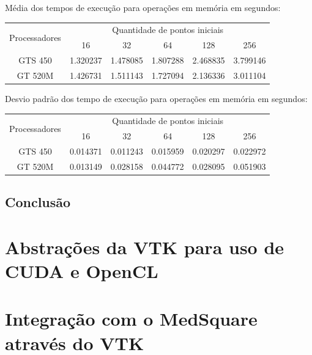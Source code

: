     \hspace{1mm}\newline
    
    \noindent Média dos tempos de execução para operações em memória em segundos:\\
    \begin{tabular}{| c | c | c | c | c | c |}
      \hline
      \multirow{2}{*}{Processadores}& \multicolumn{5}{|c|}{Quantidade de pontos iniciais} \\ \cline{2-6}
      & 16 & 32 & 64 & 128 & 256 \\ \hline
      GTS 450 & 1.320237 & 1.478085 & 1.807288 & 2.468835 & 3.799146 \\ \hline
      GT 520M & 1.426731 & 1.511143 & 1.727094 & 2.136336 & 3.011104\\ \hline

      \hline
    \end{tabular}
    
    \hspace{1mm}\newline
    
    \noindent Desvio padrão dos tempo de execução para operações em memória em segundos:\\
    \begin{tabular}{| c | c | c | c | c | c |}
      \hline
      \multirow{2}{*}{Processadores}& \multicolumn{5}{|c|}{Quantidade de pontos iniciais} \\ \cline{2-6}
      & 16 & 32 & 64 & 128 & 256 \\ \hline
      GTS 450 & 0.014371 & 0.011243 & 0.015959 & 0.020297 & 0.022972 \\ \hline
      GT 520M & 0.013149 & 0.028158 & 0.044772 & 0.028095 & 0.051903 \\ \hline

      \hline
    \end{tabular}
    
  \subsection{Conclusão}
\section{Abstrações da VTK para uso de CUDA e OpenCL}
\section{Integração com o MedSquare através do VTK}
